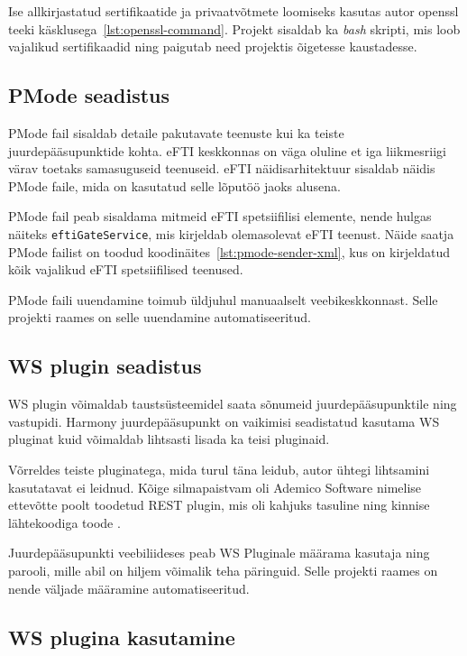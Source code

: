 Ise allkirjastatud sertifikaatide ja privaatvõtmete loomiseks 
kasutas autor openssl teeki käsklusega~\ref{lst:openssl-command}. Projekt sisaldab ka \textit{bash}
skripti, mis loob vajalikud sertifikaadid ning paigutab need projektis õigetesse kaustadesse. 


\subsection{PMode seadistus}

PMode fail sisaldab detaile pakutavate teenuste kui ka teiste juurdepääsupunktide kohta.
eFTI keskkonnas on väga oluline et iga liikmesriigi värav toetaks samasuguseid teenuseid.
eFTI näidisarhitektuur \cite{efti4eu_reference_impl} sisaldab näidis PMode faile, mida on kasutatud
selle lõputöö jaoks alusena.

PMode fail peab sisaldama mitmeid eFTI spetsiifilisi elemente, 
nende hulgas näiteks \texttt{eftiGateService}, mis kirjeldab olemasolevat eFTI teenust.
Näide saatja PMode failist on toodud koodinäites~\ref{lst:pmode-sender-xml},
kus on kirjeldatud kõik vajalikud eFTI spetsiifilised teenused.

PMode faili uuendamine toimub üldjuhul manuaalselt veebikeskkonnast. 
Selle projekti raames on selle uuendamine automatiseeritud.



\subsection{WS plugin seadistus}

WS plugin võimaldab taustsüsteemidel saata sõnumeid juurdepääsupunktile ning vastupidi.
Harmony juurdepääsupunkt on vaikimisi seadistatud kasutama WS pluginat kuid
võimaldab lihtsasti lisada ka teisi pluginaid.

Võrreldes teiste pluginatega, mida turul täna leidub, autor ühtegi lihtsamini kasutatavat ei leidnud.
Kõige silmapaistvam oli Ademico Software nimelise ettevõtte poolt toodetud REST plugin, 
mis oli kahjuks tasuline ning kinnise lähtekoodiga toode \cite{ademico_domibus_rest_api}. 

Juurdepääsupunkti veebiliideses peab WS Pluginale määrama kasutaja ning parooli, 
mille abil on hiljem võimalik teha päringuid. 
Selle projekti raames on nende väljade määramine automatiseeritud.



\subsection{WS plugina kasutamine}

